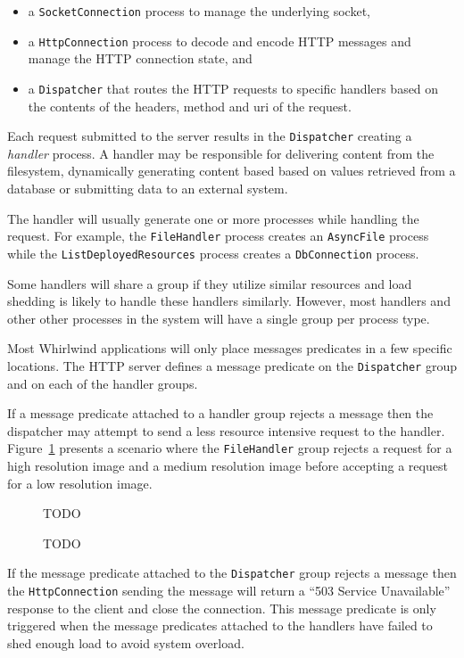 \documentclass[conference]{IEEEtran}
\begin{document}
\begin{itemize}
	\item a \verb+SocketConnection+ process to manage the underlying socket,
	\item a \verb+HttpConnection+ process to decode and encode HTTP messages and manage the HTTP connection state, and
	\item a \verb+Dispatcher+ that routes the HTTP requests to specific handlers based on the contents of the headers, method and uri of the request.
\end{itemize}

Each request submitted to the server results in the \verb+Dispatcher+ creating a \emph{handler} process. A handler may be responsible for delivering content from the filesystem, dynamically generating content based based on values retrieved from a database or submitting data to an external system. 

The handler will usually generate one or more processes while handling the request. For example, the \verb+FileHandler+ process creates an \verb+AsyncFile+ process while the \verb+ListDeployedResources+ process creates a \verb+DbConnection+ process. 

Some handlers will share a group if they utilize similar resources and load shedding is likely to handle these handlers similarly. However, most handlers and other other processes in the system will have a single group per process type.

Most Whirlwind applications will only place messages predicates in a few specific locations. The HTTP server defines a message predicate on the \verb+Dispatcher+ group and on each of the handler groups. 

If a message predicate attached to a handler group rejects a message then the dispatcher may attempt to send a less resource intensive request to the handler. Figure~\ref{figure:message-predicate} presents a scenario where the \verb+FileHandler+ group rejects a request for a high resolution image and a medium resolution image before accepting a request for a low resolution image. 

\begin{figure}[htbp]
\centering
TODO
\caption{TODO}
\label{figure:message-predicate}
\end{figure}

If the message predicate attached to the \verb+Dispatcher+ group rejects a message then the \verb+HttpConnection+ sending the message will return a ``503 Service Unavailable'' response to the client and close the connection. This message predicate is only triggered when the message predicates attached to the handlers have failed to shed enough load to avoid system overload.
\end{document}
